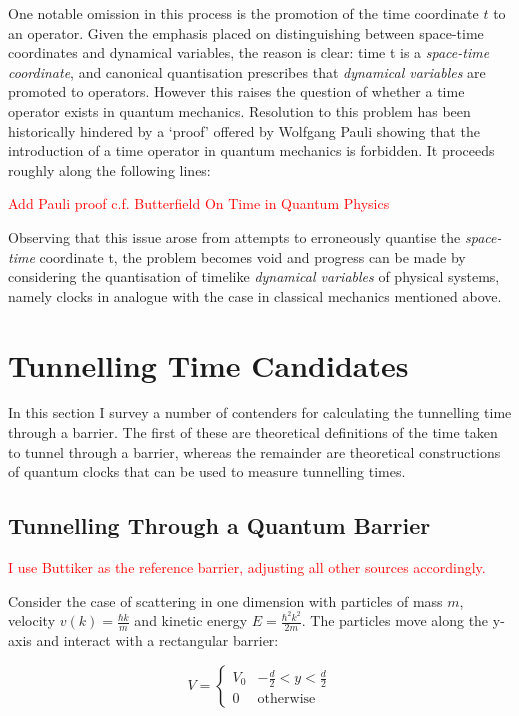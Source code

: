 \documentclass{article}
\begin{document}
One notable omission in this process is the promotion of the time coordinate $t$ to an operator. Given the emphasis placed on distinguishing between space-time coordinates and dynamical variables, the reason is clear: time t is a \textit{space-time coordinate}, and canonical quantisation prescribes that \textit{dynamical variables} are promoted to operators. However this raises the question of whether a time operator exists in quantum mechanics. Resolution to this problem has been historically hindered by a `proof' offered by Wolfgang Pauli showing that the introduction of a time operator in quantum mechanics is forbidden. It proceeds roughly along the following lines:

\textcolor{red}{Add Pauli proof c.f. Butterfield On Time in Quantum Physics}

Observing that this issue arose from attempts to erroneously quantise the \textit{space-time} coordinate t, the problem becomes void and progress can be made by considering the quantisation of timelike \textit{dynamical variables} of physical systems, namely clocks in analogue with the case in classical mechanics mentioned above. 

\section{Tunnelling Time Candidates}

In this section I survey a number of contenders for calculating the tunnelling time through a barrier. The first of these are theoretical definitions of the time taken to tunnel through a barrier, whereas the remainder are theoretical constructions of quantum clocks that can be used to measure tunnelling times.

\subsection{Tunnelling Through a Quantum Barrier}
\noindent \textcolor{red}{I use Buttiker as the reference barrier, adjusting all other sources accordingly.}

\noindent Consider the case of scattering in one dimension with particles of mass $m$, velocity $v(k) = \frac{\hbar k}{m}$ and kinetic energy $E = \frac{\hbar^2k^2}{2m}$. The particles move along the y-axis and interact with a rectangular barrier:

\begin{equation}
	V = 
	\begin{cases}
	V_0 & -\frac{d}{2}<y<\frac{d}{2}\\
		0 & \text{otherwise}
	\end{cases}
\end{equation}
\end{document}
